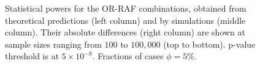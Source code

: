 \begin{figure}[!tpb]
{        }%
\caption{
Statistical powers for the OR-RAF combinations, obtained from theoretical predictions (left column) and by simulations (middle column). Their absolute differences (right column) are shown at sample sizes ranging from $100$ to $100,000$ (top to bottom).
p-value threshold is at $5\times10^{-8}$.
Fractions of cases $\phi=5\%$.
}\label{fig:phi005}
\end{figure}

